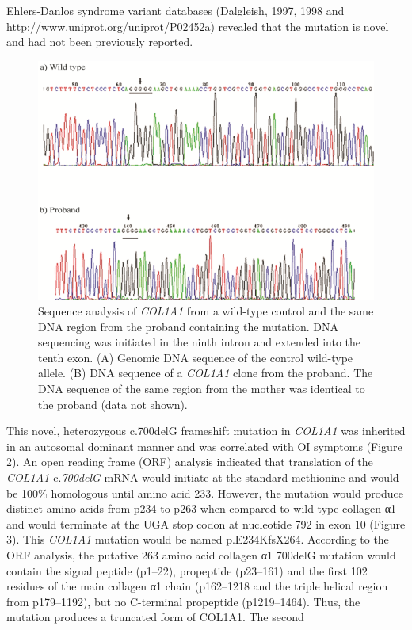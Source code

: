 Ehlers-Danlos syndrome variant databases (Dalgleish, 1997, 1998 and http://www.uniprot.org/uniprot/P02452a) revealed that the mutation is novel and had not been previously reported. \begingroup \let\clearpage\relax \onecolumn \begin{figure}[!h] \centering \includegraphics[width=\textwidth]{1415-4757-gmb-38-1-1-gf02.png} \caption{Sequence analysis of \textit{COL1A1} from a wild-type control and the same DNA region from the proband containing the mutation. DNA sequencing was initiated in the ninth intron and extended into the tenth exon. (A) Genomic DNA sequence of the control wild-type allele. (B) DNA sequence of a \textit{COL1A1} clone from the proband. The DNA sequence of the same region from the mother was identical to the proband (data not shown).} \label{Figure 2} \end{figure} \endgroup \twocolumn \par This novel, heterozygous c.700delG frameshift mutation in \textit{COL1A1} was inherited in an autosomal dominant manner and was correlated with OI symptoms (Figure 2). An open reading frame (ORF) analysis indicated that translation of the \textit{COL1A1-}c.\textit{700delG} mRNA would initiate at the standard methionine and would be 100\% homologous until amino acid 233. However, the mutation would produce distinct amino acids from p234 to p263 when compared to wild-type collagen α1 and would terminate at the UGA stop codon at nucleotide 792 in exon 10 (Figure 3). This \textit{COL1A1} mutation would be named p.E234KfsX264. According to the ORF analysis, the putative 263 amino acid collagen α1 700delG mutation would contain the signal peptide (p1–22), propeptide (p23–161) and the first 102 residues of the main collagen α1 chain (p162–1218 and the triple helical region from p179–1192), but no C-terminal propeptide (p1219–1464). Thus, the mutation produces a truncated form of COL1A1. The second 